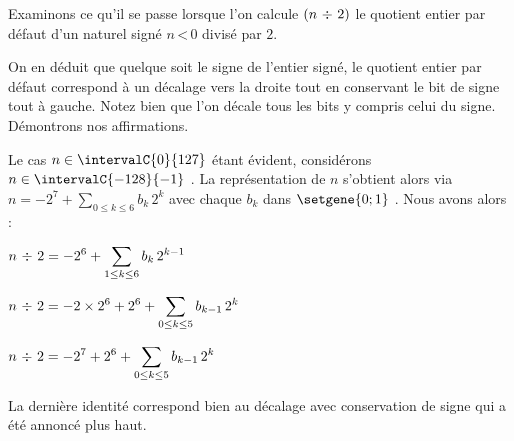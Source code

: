 Examinons ce qu'il se passe lorsque l'on calcule  $(n\, \operatorname{\operatorname{\div}}{} \, 2)$ le quotient entier par défaut d'un naturel signé $n \,\text{<}\, 0$ divisé par $2$.


\medskip


\medskip


\medskip


On en déduit que quelque soit le signe de l'entier signé, le quotient entier par défaut correspond à un décalage vers la droite tout en conservant le bit de signe tout à gauche.
Notez bien que l'on décale tous les bits y compris celui du signe. Démontrons nos affirmations.

\medskip

Le cas $n \in \intervalC{0}{127}$ étant évident, considérons $n \in \intervalC{-128}{-1}$ .
La représentation de $n$ s'obtient alors via
$\displaystyle n = -2^7 + \sum_{0 \leq k \leq 6} b_k \, 2^k$ avec chaque $b_k$ dans $\setgene{0 ; 1}$ .
Nous avons alors :

\medskip

$\displaystyle n\, \operatorname{\operatorname{\div}}{} \, 2 
	= -2^6 + \sum_{1 \leq k \leq 6} b_k \, 2^{k-1}$

\smallskip

$\displaystyle n\, \operatorname{\operatorname{\div}}{} \, 2 
	= -2\times2^6 + 2^6 + \sum_{0 \leq k \leq 5} b_{k-1} \, 2^k$

\smallskip

$\displaystyle n\, \operatorname{\operatorname{\div}}{} \, 2 
	= -2^7 + 2^6 + \sum_{0 \leq k \leq 5} b_{k-1} \, 2^k$
	
\medskip

La dernière identité correspond bien au décalage avec conservation de signe qui a été annoncé plus haut.
